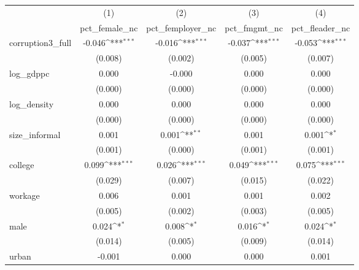 {
\def\sym#1{\ifmmode^{#1}\else\(^{#1}\)\fi}
\begin{tabular}{l*{4}{c}}
\hline\hline
            &\multicolumn{1}{c}{(1)}&\multicolumn{1}{c}{(2)}&\multicolumn{1}{c}{(3)}&\multicolumn{1}{c}{(4)}\\
            &\multicolumn{1}{c}{pct\_female\_nc}&\multicolumn{1}{c}{pct\_femployer\_nc}&\multicolumn{1}{c}{pct\_fmgmt\_nc}&\multicolumn{1}{c}{pct\_fleader\_nc}\\
\hline
corruption3\_full&      -0.046\sym{***}&      -0.016\sym{***}&      -0.037\sym{***}&      -0.053\sym{***}\\
            &     (0.008)         &     (0.002)         &     (0.005)         &     (0.007)         \\
[1em]
log\_gdppc   &       0.000         &      -0.000         &       0.000         &       0.000         \\
            &     (0.000)         &     (0.000)         &     (0.000)         &     (0.000)         \\
[1em]
log\_density &       0.000         &       0.000         &       0.000         &       0.000         \\
            &     (0.000)         &     (0.000)         &     (0.000)         &     (0.000)         \\
[1em]
size\_informal&       0.001         &       0.001\sym{**} &       0.001         &       0.001\sym{*}  \\
            &     (0.001)         &     (0.000)         &     (0.001)         &     (0.001)         \\
[1em]
college     &       0.099\sym{***}&       0.026\sym{***}&       0.049\sym{***}&       0.075\sym{***}\\
            &     (0.029)         &     (0.007)         &     (0.015)         &     (0.022)         \\
[1em]
workage     &       0.006         &       0.001         &       0.001         &       0.002         \\
            &     (0.005)         &     (0.002)         &     (0.003)         &     (0.005)         \\
[1em]
male        &       0.024\sym{*}  &       0.008\sym{*}  &       0.016\sym{*}  &       0.024\sym{*}  \\
            &     (0.014)         &     (0.005)         &     (0.009)         &     (0.014)         \\
[1em]
urban       &      -0.001         &       0.000         &       0.000         &       0.001         \\

\end{tabular}}
